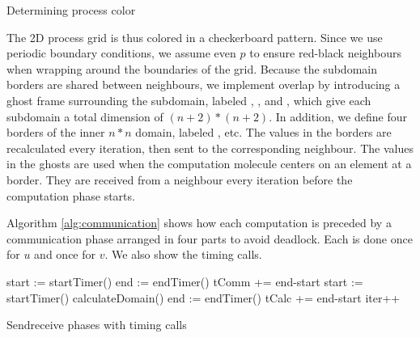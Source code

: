 \documentclass[a4paper,11pt]{article}
\begin{document}
\vspace{0.7 cm}
\begin{algorithm}[H]
\label{alg:processcolor}
  \SetAlgoLined
  \caption{Determining process color}
\end{algorithm}
\vspace{0.7 cm}

The 2D process grid is thus colored in a checkerboard pattern. Since we use periodic boundary conditions, we assume even $p$ to ensure red-black neighbours when wrapping around the boundaries of the grid. Because the subdomain borders are shared between neighbours, we implement overlap by introducing a ghost frame surrounding the subdomain, labeled , ,  and , which give each subdomain a total dimension of $(n+2)*(n+2)$. In addition, we define four borders of the inner $n*n$ domain, labeled ,  etc. The values in the borders are recalculated every iteration, then sent to the corresponding neighbour. The values in the ghosts are used when the computation molecule centers on an element at a border. They are received from a neighbour every iteration before the computation phase starts.

Algorithm \ref{alg:communication} shows how each computation is preceded by a communication phase arranged in four parts to avoid deadlock. Each  is done once for $u$ and once for $v$. We also show the timing calls.

\vspace{0.7 cm}
\begin{algorithm}[H]
\label{alg:communication}
  \SetAlgoLined
  {
    start := startTimer()\;
    end := endTimer()\;
    tComm += end-start\;
    \BlankLine
    start := startTimer()\;  
    \BlankLine 
    calculateDomain()\;
    \BlankLine
    end := endTimer()\;
    tCalc += end-start\;
    \BlankLine
    iter++\;
  }
  \caption{Sendreceive phases with timing calls}
\end{algorithm}
\vspace{0.7 cm}
\end{document}
